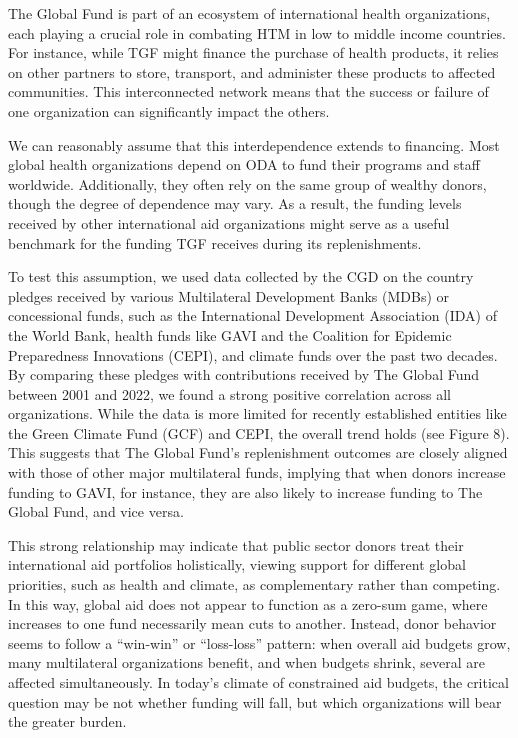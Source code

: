 \documentclass[
]{article}
\begin{document}
The Global Fund is part of an ecosystem of international health
organizations, each playing a crucial role in combating HTM in low to
middle income countries. For instance, while TGF might finance the
purchase of health products, it relies on other partners to store,
transport, and administer these products to affected communities. This
interconnected network means that the success or failure of one
organization can significantly impact the others.

We can reasonably assume that this interdependence extends to financing.
Most global health organizations depend on ODA to fund their programs
and staff worldwide. Additionally, they often rely on the same group of
wealthy donors, though the degree of dependence may vary. As a result,
the funding levels received by other international aid organizations
might serve as a useful benchmark for the funding TGF receives during
its replenishments.

To test this assumption, we used data collected by the CGD on the
country pledges received by various Multilateral Development Banks
(MDBs) or concessional funds, such as the International Development
Association (IDA) of the World Bank, health funds like GAVI and the
Coalition for Epidemic Preparedness Innovations (CEPI), and climate
funds over the past two decades. By comparing these pledges with
contributions received by The Global Fund between 2001 and 2022, we
found a strong positive correlation across all organizations. While the
data is more limited for recently established entities like the Green
Climate Fund (GCF) and CEPI, the overall trend holds (see Figure 8).
This suggests that The Global Fund's replenishment outcomes are closely
aligned with those of other major multilateral funds, implying that when
donors increase funding to GAVI, for instance, they are also likely to
increase funding to The Global Fund, and vice versa.

This strong relationship may indicate that public sector donors treat
their international aid portfolios holistically, viewing support for
different global priorities, such as health and climate, as
complementary rather than competing. In this way, global aid does not
appear to function as a zero-sum game, where increases to one fund
necessarily mean cuts to another. Instead, donor behavior seems to
follow a ``win-win'' or ``loss-loss'' pattern: when overall aid budgets
grow, many multilateral organizations benefit, and when budgets shrink,
several are affected simultaneously. In today's climate of constrained
aid budgets, the critical question may be not whether funding will fall,
but which organizations will bear the greater burden.
\end{document}
